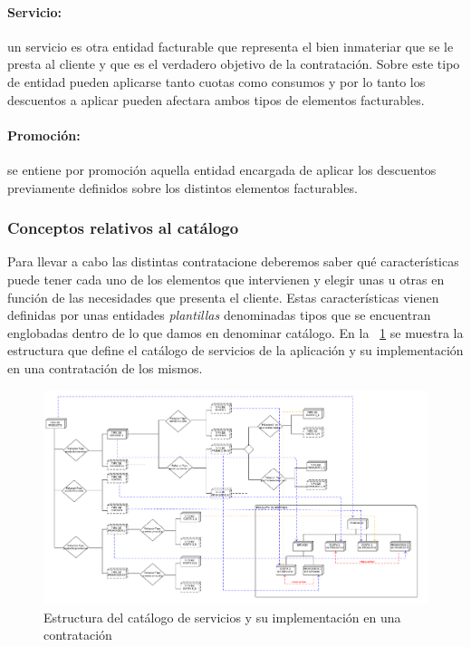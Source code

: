 \paragraph{Servicio:} un servicio es otra entidad facturable que representa el bien inmateriar que se le presta al cliente y que es el verdadero objetivo de la contratación. Sobre este tipo de entidad pueden aplicarse tanto cuotas como consumos  y por lo tanto los descuentos a aplicar pueden afectara ambos tipos de elementos facturables.

\paragraph{Promoción:} se entiene por promoción aquella entidad encargada de aplicar los descuentos previamente definidos sobre los distintos elementos facturables.



\subsubsection{Conceptos relativos al catálogo}
\label{sub:catálogo-conceptos}


Para llevar a cabo las distintas contratacione deberemos saber qué características puede tener cada uno de los elementos que intervienen y elegir unas u otras en función de las necesidades que presenta el cliente. Estas características vienen definidas por unas entidades \textit{plantillas} denominadas tipos que se encuentran englobadas dentro de lo que damos en denominar catálogo. En la \figurename~\ref{fig:estructura-catalogo} se muestra la estructura que define el catálogo de servicios de la aplicación y su implementación en una contratación de los mismos.

\begin{figure}[H]
  \centering
  \includegraphics[width=\textwidth]{imaxes/estructura-catalogo.png}
  \caption{Estructura del catálogo de servicios y su implementación en una contratación}
  \label{fig:estructura-catalogo}
\end{figure}


